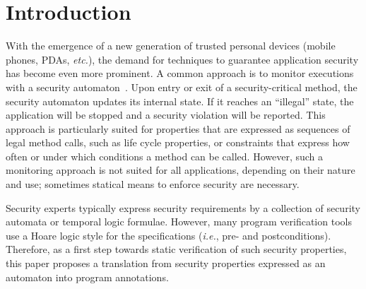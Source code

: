 \section{Introduction}\label{SecIntro}

With the emergence of a new generation of trusted personal devices
(mobile phones, PDAs, \emph{etc.}), the demand for
techniques to guarantee application security has become even more
prominent. A common approach is to monitor executions with a security
automaton~\cite{Schneider99}. Upon entry or exit of a
security-critical method, the security automaton updates its internal
state. If it reaches an ``illegal'' state, the application will be
stopped and a security violation will be reported. This approach is
particularly suited for properties that are expressed as sequences of
legal method calls, such as life cycle properties, or constraints that
express how often or under which conditions a method can be called.
%
However, such a monitoring approach is not suited for all
applications, depending on their nature and use; sometimes statical
means to enforce security are necessary.


Security experts typically express security requirements by a collection of
security automata or temporal logic formulae. However, many program
verification tools use a Hoare logic style for the specifications
(\emph{i.e.}, pre- and postconditions).
Therefore, as a first step towards static
verification of such security properties, this paper proposes a
translation from security properties expressed as an automaton
into program annotations.

